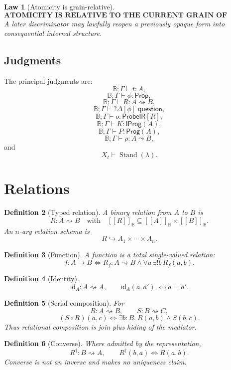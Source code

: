 \documentclass[11pt,oneside]{article}
\newtheorem{definition}{Definition}[section]
\newtheorem{law}[definition]{Law}
\newcommand{\B}{\mathbb B}
\newcommand{\Prop}{\mathsf{Prop}}
\newcommand{\Prog}{\mathsf{Prog}}
\newcommand{\ProbeIR}{\mathsf{ProbeIR}}
\newcommand{\Stand}{\operatorname{Stand}}
\newcommand{\den}[1]{[\![#1]\!]}
\begin{document}
\begin{law}[Atomicity is grain-relative]
\[
\boxed{\textbf{ATOMICITY IS RELATIVE TO THE CURRENT GRAIN OF INQUIRY.}}
\]
A later discriminator may lawfully reopen a previously opaque form into consequential internal structure.
\end{law}

\subsection{Judgments}

The principal judgments are:
\[
\B;\Gamma\vdash t:A,
\]
\[
\B;\Gamma\vdash\phi:\Prop,
\]
\[
\B;\Gamma\vdash R:A\rightsquigarrow B,
\]
\[
\B;\Gamma\vdash ?\Delta[\phi]\;\mathsf{question},
\]
\[
\B;\Gamma\vdash o:\ProbeIR[R],
\]
\[
\B;\Gamma\vdash K:\mathsf{IProg}(A),
\]
\[
\B;\Gamma\vdash P:\Prog(A),
\]
\[
\B;\Gamma\vdash \rho:A\leadsto B,
\]
and
\[
X_t\vdash \Stand(\lambda).
\]

\section{Relations}

\begin{definition}[Typed relation]
A binary relation from \(A\) to \(B\) is
\[
R:A\rightsquigarrow B
\quad\text{with}\quad
\den{R}_{\B}\subseteq \den A_{\B}\times\den B_{\B}.
\]
An \(n\)-ary relation schema is
\[
R\hookrightarrow A_1\times\cdots\times A_n.
\]
\end{definition}

\begin{definition}[Function]
A function is a total single-valued relation:
\[
f:A\to B
\iff
R_f:A\rightsquigarrow B
\land
\forall a\,\exists!b\,R_f(a,b).
\]
\end{definition}

\begin{definition}[Identity]
\[
\mathsf{id}_A:A\rightsquigarrow A,
\qquad
\mathsf{id}_A(a,a').
\iff a=a'.
\]
\end{definition}

\begin{definition}[Serial composition]
For
\[
R:A\rightsquigarrow B,\qquad S:B\rightsquigarrow C,
\]
\[
\boxed{
(S\circ R)(a,c)
\iff
\exists b:B.\ R(a,b)\land S(b,c).
}
\]
Thus relational composition is join plus hiding of the mediator.
\end{definition}

\begin{definition}[Converse]
Where admitted by the representation,
\[
R^\dagger:B\rightsquigarrow A,
\qquad
R^\dagger(b,a)\iff R(a,b).
\]
Converse is not an inverse and makes no uniqueness claim.
\end{definition}
\end{document}
